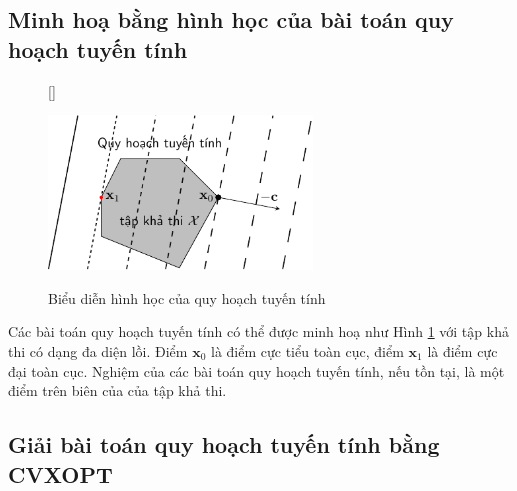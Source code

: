  
\subsection{Minh hoạ bằng hình học của bài toán quy hoạch tuyến tính}
 
\begin{figure}[t]
    [\FBwidth]
    {\caption{Biểu diễn hình học của quy hoạch tuyến tính}
    \label{fig:17_lp}}
    {\includegraphics[width=7cm]{Chapters/08_ConvexOptimization/17_convexopt/latex/lp.pdf}}
\end{figure}
 
Các bài toán quy hoạch tuyến tính có thể được minh hoạ như Hình \ref{fig:17_lp} với tập khả thi có dạng đa diện lồi. Điểm
$\mathbf{x}_0$ là điểm cực tiểu toàn cục, điểm
$\mathbf{x}_1$ là điểm cực đại toàn cục. Nghiệm
của các bài toán quy hoạch tuyến tính, nếu tồn tại, là một điểm trên biên của của tập khả thi. 

 
 
\subsection{Giải bài toán quy hoạch tuyến tính bằng CVXOPT}
 
